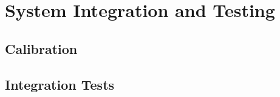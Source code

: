\chapter{System Integration and Testing}
\label{chap:testing}

\setcounter{section}{0}
\setcounter{subsection}{0}

\section{Calibration}
\label{sec:calibration}

\FloatBarrier  %

\section{Integration Tests}
\label{sec:integration}

\FloatBarrier  %



